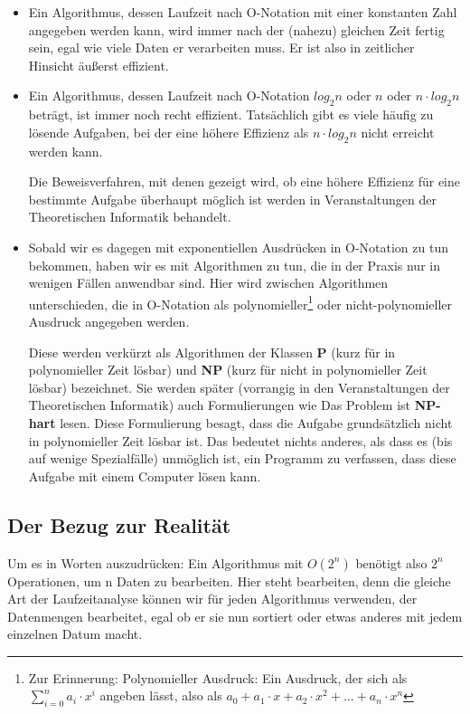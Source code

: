 \begin{itemize}
	\item Ein Algorithmus, dessen Laufzeit nach O-Notation mit einer konstanten Zahl angegeben werden kann, wird immer nach der (nahezu) gleichen Zeit fertig sein, egal wie viele Daten er verarbeiten muss. Er ist also in zeitlicher Hinsicht äußerst effizient.
	\item Ein Algorithmus, dessen Laufzeit nach O-Notation \(log_2 n\) oder \(n\) oder \(n \cdot log_2 n\) beträgt, ist immer noch recht effizient. Tatsächlich gibt es viele häufig zu lösende Aufgaben, bei der eine höhere Effizienz als \(n \cdot log_2 n\) nicht erreicht werden kann.
	
	Die Beweisverfahren, mit denen gezeigt wird, ob eine höhere Effizienz für eine bestimmte Aufgabe überhaupt möglich ist werden in Veranstaltungen der Theoretischen Informatik behandelt.
	\item Sobald wir es dagegen mit exponentiellen Ausdrücken in O-Notation zu tun bekommen, haben wir es mit Algorithmen zu tun, die in der Praxis nur in wenigen Fällen anwendbar sind. Hier wird zwischen Algorithmen unterschieden, die in O-Notation als polynomieller\footnote{Zur Erinnerung: Polynomieller Ausdruck: Ein Ausdruck, der sich als \(\sum_{i = 0}^{n} a_i \cdot x^i\) angeben lässt, also als \(a_0 + a_1 \cdot x + a_2 \cdot x^2 + ... + a_n \cdot x^n\)} oder nicht-polynomieller Ausdruck angegeben werden. 
	
	Diese werden verkürzt als Algorithmen der Klassen \textbf{P} (kurz für \glqq{}in polynomieller Zeit lösbar\grqq{}) und \textbf{NP} (kurz für \glqq{}nicht in polynomieller Zeit lösbar\grqq{}) bezeichnet. Sie werden später (vorrangig in den Veranstaltungen der Theoretischen Informatik) auch Formulierungen wie \glqq{}Das Problem ist \textbf{NP-hart}\grqq{} lesen. Diese Formulierung besagt, dass die Aufgabe grundsätzlich nicht in polynomieller Zeit lösbar ist. Das bedeutet nichts anderes, als dass es (bis auf wenige Spezialfälle) unmöglich ist, ein Programm zu verfassen, dass diese Aufgabe mit einem Computer lösen kann. 
\end{itemize}


\subsection{Der Bezug zur Realität}

Um es in Worten auszudrücken: Ein Algorithmus mit \(O(2^n)\) benötigt also \(2^n\) Operationen, um n Daten zu bearbeiten. Hier steht bearbeiten, denn die gleiche Art der Laufzeitanalyse können wir für jeden Algorithmus verwenden, der Datenmengen bearbeitet, egal ob er sie nun sortiert oder etwas anderes mit jedem einzelnen Datum macht.\\

